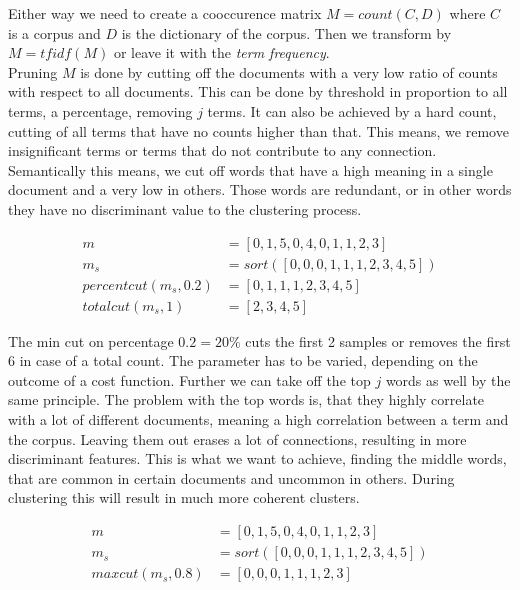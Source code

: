     Either way we need to create a cooccurence matrix $M = count(C, D)$ where $C$ is a corpus and $D$ is the dictionary of the corpus. Then we transform by $M = tfidf(M)$ or leave it with the \emph{term frequency}.\\

    Pruning $M$ is done by cutting off the documents with a very low ratio of counts with respect to all documents. This can be done by threshold in proportion to all terms, a percentage, removing $j$ terms. It can also be achieved by a hard count, cutting of all terms that have no counts higher than that. This means, we remove insignificant terms or terms that do not contribute to any connection. Semantically this means, we cut off words that have a high meaning in a single document and a very low in others. Those words are redundant, or in other words they have no discriminant value to the clustering process.

      \begin{equation}
      \begin{split}
        m &= [0, 1, 5, 0, 4, 0, 1, 1, 2, 3] \\
        m_s &= sort( [0, 0, 0, 1, 1, 1, 2, 3, 4, 5] ) \\
        percentcut(m_s, 0.2) &= [0, 1, 1, 1, 2, 3, 4, 5] \\
        totalcut(m_s, 1) &= [2, 3, 4, 5]
      \end{split}
      \end{equation}

    The min cut on percentage $0.2 = 20\%$ cuts the first 2 samples or removes the first 6 in case of a total count. The parameter has to be varied, depending on the outcome of a cost function. Further we can take off the top $j$ words as well by the same principle. The problem with the top words is, that they highly correlate with a lot of different documents, meaning a high correlation between a term and the corpus. Leaving them out erases a lot of connections, resulting in more discriminant features. This is what we want to achieve, finding the middle words, that are common in certain documents and uncommon in others. During clustering this will result in much more coherent clusters.

      \begin{equation}
      \begin{split}
        m &= [0, 1, 5, 0, 4, 0, 1, 1, 2, 3] \\
        m_s &= sort( [0, 0, 0, 1, 1, 1, 2, 3, 4, 5] ) \\
        maxcut(m_s, 0.8) &= [0, 0, 0, 1, 1, 1, 2, 3]
      \end{split}
      \end{equation}

